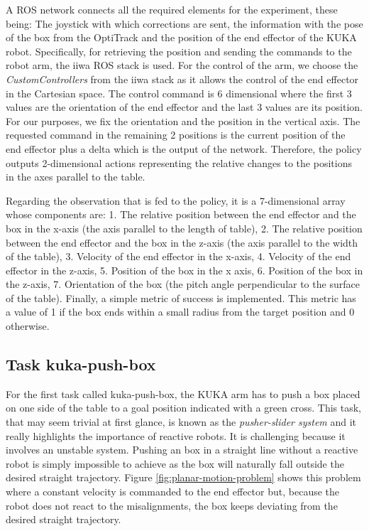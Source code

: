 A ROS network connects all the required elements for the experiment, these being: The joystick with which corrections are sent, the information with the pose of the box from the OptiTrack and the position of the end effector of the KUKA robot. Specifically, for retrieving the position and sending the commands to the robot arm, the iiwa ROS stack \cite{iiwa} is used. For the control of the arm, we choose the \textit{CustomControllers} from the iiwa stack as it allows the control of the end effector in the Cartesian space. The control command is 6 dimensional where the first 3 values are the orientation of the end effector and the last 3 values are its position. For our purposes, we fix the orientation and the position in the vertical axis. The requested command in the remaining 2 positions is the current position of the end effector plus a delta which is the output of the network. Therefore, the policy outputs 2-dimensional actions representing the relative changes to the positions in the axes parallel to the table.

Regarding the observation that is fed to the policy, it is a 7-dimensional array whose components are: 1. The relative position between the end effector and the box in the x-axis (the axis parallel to the length of table), 2. The relative position between the end effector and the box in the z-axis (the axis parallel to the width of the table), 3. Velocity of the end effector in the x-axis, 4. Velocity of the end effector in the z-axis, 5. Position of the box in the x axis, 6. Position of the box in the z-axis, 7. Orientation of the box (the pitch angle perpendicular to the surface of the table). Finally, a simple metric of success is implemented. This metric has a value of 1 if the box ends within a small radius from the target position and 0 otherwise.

\subsection{Task kuka-push-box}
\label{subsection:Push box in a straight line}

For the first task called kuka-push-box, the KUKA arm has to push a box placed on one side of the table to a goal position indicated with a green cross. This task, that may seem trivial at first glance, is known as the \textit{pusher-slider system} \cite{constant_velocity} and it really highlights the importance of reactive robots. It is challenging because it involves an unstable system.
Pushing an box in a straight line without a reactive robot is simply impossible to achieve as the box will naturally fall outside the desired straight trajectory. Figure \ref{fig:planar-motion-problem} shows this problem where a constant velocity is commanded to the end effector but, because the robot does not react to the misalignments, the box keeps deviating from the desired straight trajectory.


